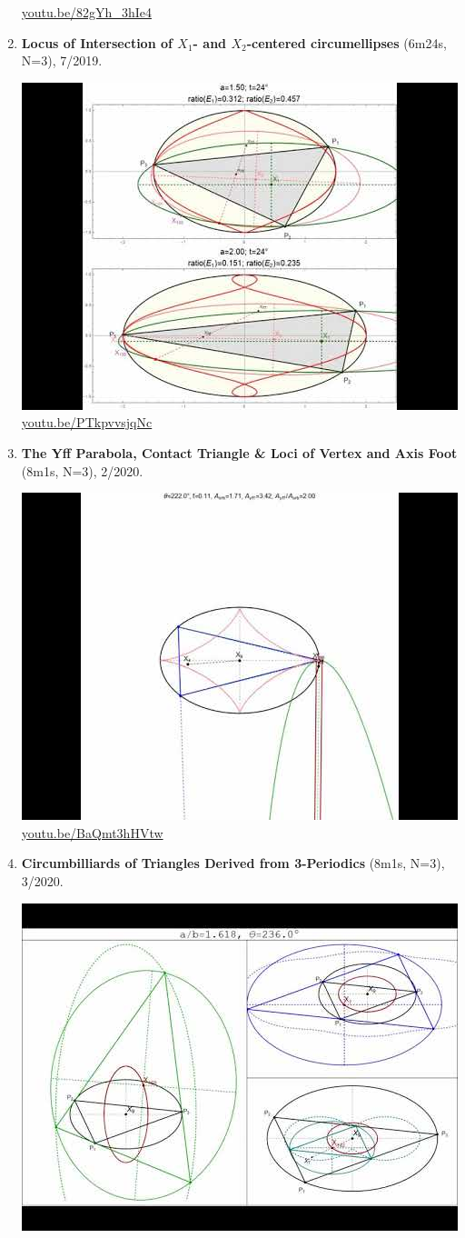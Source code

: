 \documentclass[12pt]{amsart}
\begin{document}
\begin{enumerate}[resume]
\begin{center}
\href{https://youtu.be/82gYh_3hIe4}{\url{youtu.be/82gYh\_3hIe4}}\end{center}
% 
\item \textbf{Locus of Intersection of $X_{1}$- and $X_{2}$-centered circumellipses} (6m24s, N=3), 7/2019. 
\begin{center}\includegraphics[width=.5\textwidth]{pics/PTkpvvsjqNc.jpg} \\ 
\href{https://youtu.be/PTkpvvsjqNc}{\url{youtu.be/PTkpvvsjqNc}}\end{center}
% 
\item \textbf{The Yff Parabola, Contact Triangle \& Loci of Vertex and Axis Foot} (8m1s, N=3), 2/2020. 
\begin{center}\includegraphics[width=.5\textwidth]{pics/BaQmt3hHVtw.jpg} \\ 
\href{https://youtu.be/BaQmt3hHVtw}{\url{youtu.be/BaQmt3hHVtw}}\end{center}
% 
\item \textbf{Circumbilliards of Triangles Derived from 3-Periodics} (8m1s, N=3), 3/2020. 
\begin{center}\includegraphics[width=.5\textwidth]{pics/Og7xLgkrLqw.jpg} \\ 

\end{center}
\end{enumerate}
\end{document}
